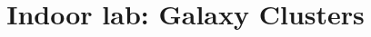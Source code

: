 \documentclass[11pt, preprint]{aastex}
\begin{document}
\title{\bf Indoor lab: Galaxy Clusters}

~
\vspace{-30pt}


\end{document}
